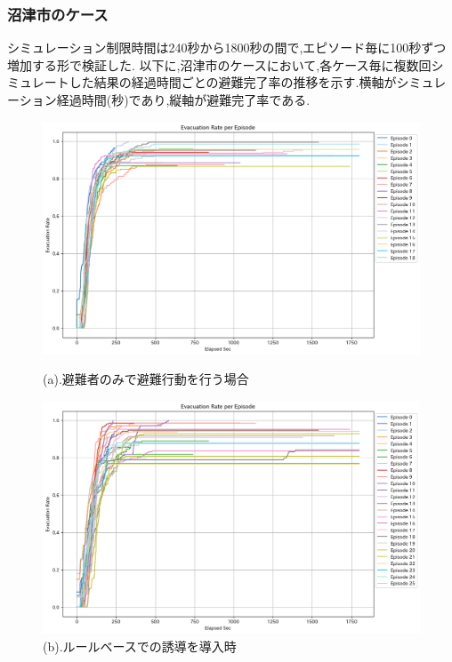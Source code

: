 \subsubsection{沼津市のケース}
シミュレーション制限時間は240秒から1800秒の間で,エピソード毎に100秒ずつ増加する形で検証した.
以下に,沼津市のケースにおいて,各ケース毎に複数回シミュレートした結果の経過時間ごとの避難完了率の推移を示す.横軸がシミュレーション経過時間(秒)であり,縦軸が避難完了率である.
\begin{figure}[H]
  \centering
  \begin{minipage}{0.45\textwidth}
      \centering
      \includegraphics[width=\textwidth]{Figures/Numazu-EvaOnly-ERE.png} %
      \caption{(a).避難者のみで避難行動を行う場合}
      \label{fig:graph-a}
  \end{minipage}
  \hfill %
  \begin{minipage}{0.45\textwidth}
      \centering
      \includegraphics[width=\textwidth]{Figures/Numazu-RuleModel-ERE.png} %
      \caption{(b).ルールベースでの誘導を導入時}
      \label{fig:graph-b}
  \end{minipage}
  

\end{figure}
